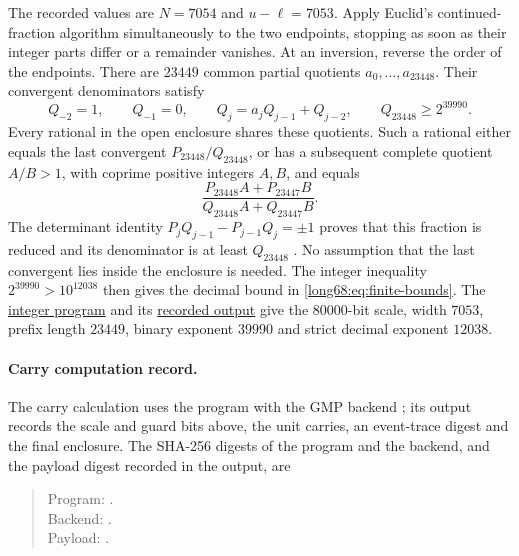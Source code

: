 \documentclass[11pt]{article}
\begin{document}
The recorded values are $N=7054$ and $u-\ell=7053$.
Apply Euclid's continued-fraction algorithm simultaneously to the two
endpoints, stopping as soon as their integer parts differ or a remainder
vanishes. At an inversion, reverse the order of the endpoints. There
are $23449$ common partial quotients $a_0,\ldots,a_{23448}$.
Their convergent denominators satisfy
\[
 Q_{-2}=1,\qquad Q_{-1}=0,\qquad
 Q_j=a_jQ_{j-1}+Q_{j-2},\qquad Q_{23448}\ge2^{39990}.
\]
Every rational in the open enclosure shares these quotients. Such a
rational either equals the last convergent $P_{23448}/Q_{23448}$,
or has a subsequent complete quotient $A/B>1$, with coprime positive
integers $A,B$, and equals
\[
 \frac{P_{23448}A+P_{23447}B}{Q_{23448}A+Q_{23447}B}.
\]
The determinant identity
$P_jQ_{j-1}-P_{j-1}Q_j=\pm1$ proves that this fraction is reduced and
its denominator is at least $Q_{23448}$
\cite[\S1.12(ii), (1.12.5)--(1.12.7), (1.12.20)--(1.12.21)]{nist-dlmf}.
No assumption that the last convergent lies inside the enclosure is
needed. The integer inequality $2^{39990}>10^{12038}$ then gives the
decimal bound in \eqref{long68:eq:finite-bounds}.
The
\href{https://github.com/wcook04/plectis-erdos/blob/cd3bd6fe245867a435e15d503ccedd699c5d02e2/scripts/check_erdos68_continued_fraction.py}{integer program}
and its
\href{https://github.com/wcook04/plectis-erdos/blob/cd3bd6fe245867a435e15d503ccedd699c5d02e2/verification/erdos68-continued-fraction.json}{recorded output}
give the $80000$-bit scale, width $7053$, prefix length $23449$,
binary exponent $39990$ and strict decimal exponent $12038$.

\paragraph{Carry computation record.}
The carry calculation uses the program 
with the GMP backend ; its
output  records the scale and
guard bits above, the unit carries, an event-trace digest and the final
enclosure. The SHA-256 digests of the program and the backend, and the
payload digest recorded in the output, are
\begin{quote}\footnotesize
Program: .\\
Backend: .\\
Payload: .
\end{quote}
\end{document}
